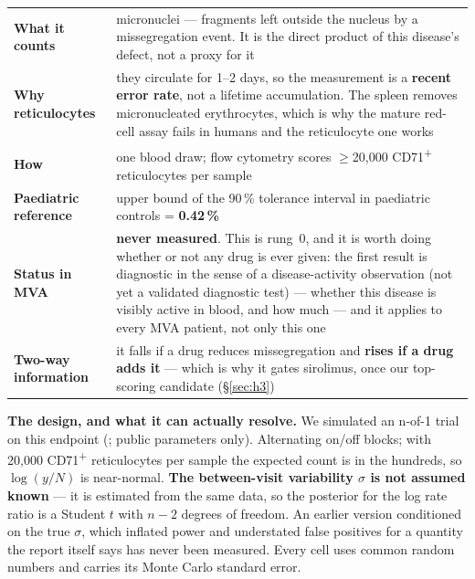 \documentclass[10pt]{article}
\begin{document}
\begin{keybox}[title={The endpoint: micronucleated reticulocytes (\%MN-RET)}]
\tablefont
\begin{tabularx}{\linewidth}{@{}P{2.9cm}L@{}}
\textbf{What it counts} & micronuclei --- fragments left outside the nucleus by a missegregation event. It is the direct product of this disease's defect, not a proxy for it\\
\textbf{Why reticulocytes} & they circulate for 1--2 days, so the measurement is a \textbf{recent error rate}, not a lifetime accumulation. The spleen removes micronucleated erythrocytes, which is why the mature red-cell assay fails in humans and the reticulocyte one works\\
\textbf{How} & one blood draw; flow cytometry scores $\geq$20{,}000 CD71\textsuperscript{+} reticulocytes per sample \citep{dertinger,dertinger11}\\
\textbf{Paediatric reference} & upper bound of the 90\,\% tolerance interval in paediatric controls = \textbf{0.42\,\%} \citep{baig}\\
\textbf{Status in MVA} & \textbf{never measured}. This is rung~0, and it is worth doing whether or not any drug is ever given: the first result is diagnostic in the sense of a disease-activity observation (not yet a validated diagnostic
test) --- whether this disease is visibly active in blood, and how much --- and it applies to every MVA patient, not only this one\\
\textbf{Two-way information} & it falls if a drug reduces missegregation and \textbf{rises if a drug adds it} --- which is why it gates sirolimus, once our top-scoring candidate (§\ref{sec:h3})
\end{tabularx}
\end{keybox}

\textbf{The design, and what it can actually resolve.} We simulated an n-of-1 trial on this endpoint
(; public parameters only). Alternating on/off blocks; with 20,000 CD71\textsuperscript{+}
reticulocytes per sample the expected count is in the hundreds, so $\log(y/N)$ is near-normal. \textbf{The
between-visit variability $\sigma$ is not assumed known} --- it is estimated from the same data, so the posterior
for the log rate ratio is a Student $t$ with $n-2$ degrees of freedom. An earlier version conditioned on the true
$\sigma$, which inflated power and understated false positives for a quantity the report itself says has never been
measured. Every cell uses common random numbers and carries its Monte Carlo standard error.
\end{document}
